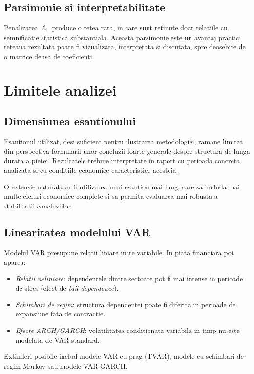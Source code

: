 \subsection{Parsimonie si interpretabilitate}

Penalizarea $\ell_1$ produce o retea rara, in care sunt retinute doar relatiile
cu semnificatie statistica substantiala. Aceasta parsimonie este un avantaj
practic: reteaua rezultata poate fi vizualizata, interpretata si discutata,
spre deosebire de o matrice densa de coeficienti.

\section{Limitele analizei}

\subsection{Dimensiunea esantionului}

Esantionul utilizat, desi suficient pentru ilustrarea metodologiei, ramane
limitat din perspectiva formularii unor concluzii foarte generale despre
structura de lunga durata a pietei. Rezultatele trebuie interpretate in raport
cu perioada concreta analizata si cu conditiile economice caracteristice
acesteia.

O extensie naturala ar fi utilizarea unui esantion mai lung, care sa includa mai
multe cicluri economice complete si sa permita evaluarea mai robusta a
stabilitatii concluziilor.

\subsection{Linearitatea modelului VAR}

Modelul VAR presupune relatii liniare intre variabile. In piata financiara
pot aparea:
\begin{itemize}
    \item \textit{Relatii neliniare}: dependentele dintre sectoare pot fi
    mai intense in perioade de stres (efect de \textit{tail dependence}).
    \item \textit{Schimbari de regim}: structura dependentei poate fi diferita
    in perioade de expansiune fata de contractie.
    \item \textit{Efecte ARCH/GARCH}: volatilitatea conditionata variabila in
    timp nu este modelata de VAR standard.
\end{itemize}
Extinderi posibile includ modele VAR cu prag (TVAR), modele cu schimbari de
regim Markov sau modele VAR-GARCH.

